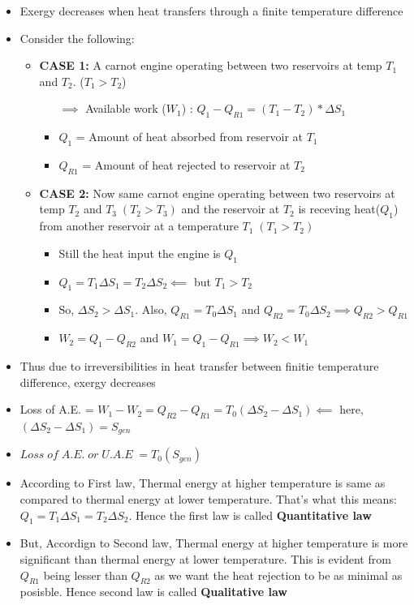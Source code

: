 \documentclass[8pt]{article}
\begin{document}
	\begin{itemize}
		\item Exergy decreases when heat transfers through a finite temperature difference
		\item Consider the following:
			\begin{itemize}
				\item \textbf{CASE 1:} A carnot engine operating between two reservoirs at temp $T_1$ and $T_2$. ($T_1 > T_2$)
				\begin{itemize}
					\item[$\implies$] Available work ($W_1$) : $Q_1-Q_{R1} = (T_1-T_2)*\Delta S_1$
					\item $Q_1$ = Amount of heat absorbed from reservoir at $T_1$
					\item $Q_{R1}$ = Amount of heat rejected to reservoir at $T_2$\\
				\end{itemize}
				\item \textbf{CASE 2:} Now same carnot engine operating between two reservoirs at temp $T_2$ and $T_3\;(T_2 > T_3)$ and the reservoir at $T_2$ is receving heat($Q_1$) from another reservoir at a temperature $T_1\;(T_1 > T_2)$
				\begin{itemize}
					\item Still the heat input the engine is $Q_1$
					\item $Q_1 = T_1\Delta S_1 = T_2\Delta S_2 \impliedby$ but $T_1 > T_2$
					\item So, $\Delta S_2 > \Delta S_1$. Also, $Q_{R1}=T_0\Delta S_1$ and $Q_{R2}=T_0\Delta S_2 \implies \boxed{Q_{R2} > Q_{R1}}$
					\item $W_2 = Q_1-Q_{R2}$ and $W_1 = Q_1-Q_{R1} \implies \boxed{W_2<W_1}$ 
				\end{itemize}
			\end{itemize}
		\item Thus due to irreversibilities in heat transfer between finitie temperature difference, exergy decreases
		\item Loss of A.E. = $W_1-W_2 = Q_{R2}-Q_{R1} = T_0(\Delta S_2 - \Delta S_1) \impliedby$ here, $\boxed{(\Delta S_2 - \Delta S_1) = S_{gen}}$
		\item $\boxed{Loss\;of\;A.E.\;or\;U.A.E\;=T_0(S_{gen})}$
		\item According to First law, Thermal energy at higher temperature is same as compared to thermal energy at lower temperature. That's what this means: $Q_1 = T_1\Delta S_1 = T_2\Delta S_2$. Hence the first law is called \textbf{Quantitative law}
		\item But, Accordign to Second law, Thermal energy at higher temperature is more significant than thermal energy at lower temperature. This is evident from $Q_{R1}$ being lesser than $Q_{R2}$ as we want the heat rejection to be as minimal as posisble. Hence second law is called \textbf{Qualitative law}
	\end{itemize}\hrulefill\\\\
\end{document}

